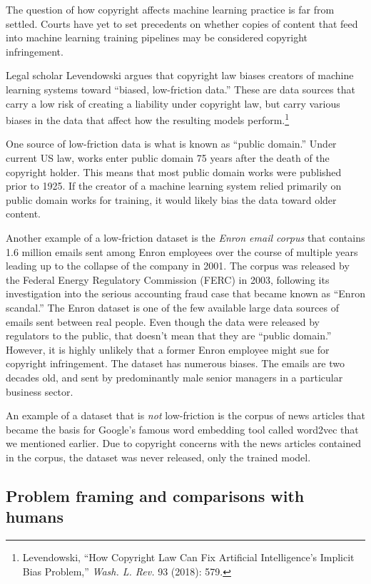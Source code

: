 \documentclass{tufte-book}
\begin{document}
The question of how copyright affects machine learning practice is far
from settled. Courts have yet to set precedents on whether copies of
content that feed into machine learning training pipelines may be
considered copyright infringement.

Legal scholar Levendowski argues that copyright law biases creators of
machine learning systems toward ``biased, low-friction data.'' These are
data sources that carry a low risk of creating a liability under
copyright law, but carry various biases in the data that affect how the
resulting models perform.\footnote{Levendowski, {``How Copyright Law Can
  Fix Artificial Intelligence's Implicit Bias Problem,''} \emph{Wash. L.
  Rev.} 93 (2018): 579.}

One source of low-friction data is what is known as ``public domain.''
Under current US law, works enter public domain 75 years after the death
of the copyright holder. This means that most public domain works were
published prior to 1925. If the creator of a machine learning system
relied primarily on public domain works for training, it would likely
bias the data toward older content.

Another example of a low-friction dataset is the \emph{Enron email
corpus} that contains 1.6 million emails sent among Enron employees over
the course of multiple years leading up to the collapse of the company
in 2001. The corpus was released by the Federal Energy Regulatory
Commission (FERC) in 2003, following its investigation into the serious
accounting fraud case that became known as ``Enron scandal.'' The Enron
dataset is one of the few available large data sources of emails sent
between real people. Even though the data were released by regulators to
the public, that doesn't mean that they are ``public domain.'' However,
it is highly unlikely that a former Enron employee might sue for
copyright infringement. The dataset has numerous biases. The emails are
two decades old, and sent by predominantly male senior managers in a
particular business sector.

An example of a dataset that is \emph{not} low-friction is the corpus of
news articles that became the basis for Google's famous word embedding
tool called word2vec that we mentioned earlier. Due to copyright
concerns with the news articles contained in the corpus, the dataset was
never released, only the trained model.

\hypertarget{problem-framing-and-comparisons-with-humans}{%
\subsection{Problem framing and comparisons with
humans}\label{problem-framing-and-comparisons-with-humans}}
\end{document}
